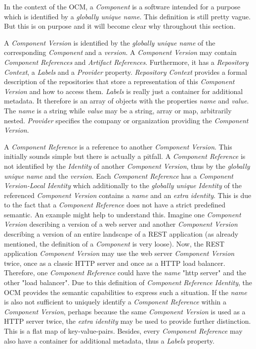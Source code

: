 \noindent In the context of the OCM, a \emph{Component} is a software intended for a purpose which is identified by a \emph{globally unique name}. This definition is still pretty vague. But this is on purpose and it will become clear why throughout this section.\par 
\noindent A \emph{Component Version} is identified by the \emph{globally unique name} of the corresponding \emph{Component} and a \emph{version}. A \emph{Component Version} may contain \emph{Component References} and \emph{Artifact References}. Furthermore, it has a \emph{Repository Context}, a \emph{Labels} and a \emph{Provider} property. \emph{Repository Context} provides a formal description of the repositories that store a representation of this \emph{Component Version} and how to access them. \emph{Labels} is really just a container for additional metadata. It therefore is an array of objects with the properties \emph{name} and \emph{value}. The \emph{name} is a string while \emph{value} may be a string, array or map, arbitrarily nested. \emph{Provider} specifies the company or organization providing the \emph{Component Version}.\par 
\noindent A \emph{Component Reference} is a reference to another \emph{Component Version}. This initially sounds simple but there is actually a pitfall. A \emph{Component Reference} is not identified by the \emph{Identity} of another \emph{Component Version}, thus by the \emph{globally unique name} and the \emph{version}. Each \emph{Component Reference} has a \emph{Component Version-Local Identity} which additionally to the \emph{globally unique Identity} of the referenced \emph{Component Version} contains a \emph{name} and an \emph{extra identity}. This is due to the fact that a \emph{Component Reference} does not have a strict predefined semantic. An example might help to understand this. Imagine one \emph{Component Version} describing a version of a web server and another \emph{Component Version} describing a version of an entire landscape of a REST application (as already mentioned, the definition of a \emph{Component} is very loose). Now, the REST application \emph{Component Version} may use the web server \emph{Component Version} twice, once as a classic HTTP server and once as a HTTP load balancer. Therefore, one \emph{Component Reference} could have the \emph{name} "http server" and the other "load balancer". Due to this definition of \emph{Component Reference Identity}, the OCM provides the semantic capabilities to express such a situation. If the \emph{name} is also not sufficient to uniquely identify a \emph{Component Reference} within a \emph{Component Version}, perhaps because the same \emph{Component Version} is used as a HTTP server twice, the \emph{extra identity} may be used to provide further distinction. This is a flat map of key-value-pairs. Besides, every \emph{Component Reference} may also have a container for additional metadata, thus a \emph{Labels} property.\par 
